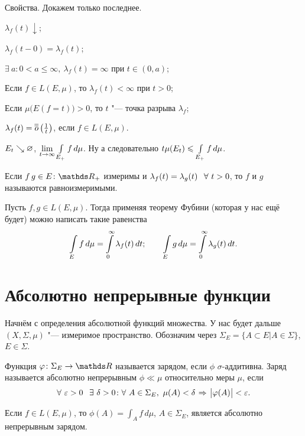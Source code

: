 \begin{Ut}
Свойства. Докажем только последнее.
\begin{roItems}
  \item $\lambda_f(t)\downarrow$;
  \item $\lambda_f(t-0)=\lambda_f(t)$;
  \item $\exists\ a\colon 0<a\le \infty,\ \lambda_f(t)=\infty$ при $t\in(0,a)$;
  \item Если $f\in L(E,\mu)$, то $\lambda_f(t)<\infty$ при $t>0$;
  \item Если $\mu\big(E(f=t)\big)>0$, то $t$ "--- точка разрыва $\lambda_f$;
  \item $\lambda_f(t) = \overline{\overline o}\left(\frac1t\right)$, если $f\in L(E,\mu)$.
\end{roItems}
\end{Ut}
\begin{Proof}
$E_t\searrow \varnothing$, $\lim\limits_{t\rightarrow\infty} \int\limits_{E_+}f\,d\mu$. Ну а следовательно $t\mu(E_t)\leqslant \int\limits_{E_+}f\,d\mu$.
\end{Proof}

\begin{Def}
  Если $f\,g\in E\colon \R_+$ измеримы и $\lambda_f(t) = \lambda_g(t)\pau \forall\ t>0$, то $f$ и $g$ называются равноизмеримыми.
\end{Def}

Пусть $f,g\in L(E,\mu)$. Тогда применяя теорему Фубини (которая у нас ещё будет) можно написать такие равенства 
\[\int\limits_{E}f\,d\mu = \int\limits_0^\infty\lambda_f(t)\,dt;\qquad \int\limits_{E}g\,d\mu = \int\limits_0^\infty\lambda_g(t)\,dt.\]
\section{Абсолютно непрерывные функции}
Начнём с определения абсолютной функций множества. У нас будет дальше $(X,\Sigma,\mu)$ "--- измеримое пространство. Обозначим через $\Sigma_E=\{A\subset E|A\in\Sigma\}$, $E\in\Sigma$.
\begin{Def}
 Функция $\phi\colon \Sigma_E\to\R$ называется зарядом, если $\phi$ $\sigma$-аддитивна. Заряд называется абсолютно непрерывным $\phi\ll\mu$ относительно меры $\mu$, если 
 \[
  \forall\ \e>0\pau\exists\ \delta>0\colon \forall\ A\in\Sigma_E,\ \mu(A)<\delta\imp\big|\phi(A)\big|<\e.
\]
\end{Def}

\begin{The}
  Если $f\in L(E,\mu)$, то $\phi(A) =\int_A f\,d\mu$, $A\in \Sigma_E$, является абсолютно непрерывным зарядом.
\end{The}

